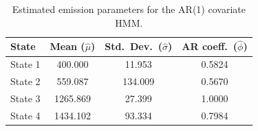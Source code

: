 \begin{table}[ht]
\centering
\begin{tabular}{lccc}
\hline
State & Mean ($\hat{\mu}$) & Std.\ Dev.\ ($\hat{\sigma}$) & AR coeff.\ ($\hat{\phi}$) \\
\hline
State 1 & 400.000 & 11.953 & 0.5824 \\
State 2 & 559.087 & 134.009 & 0.5670 \\
State 3 & 1265.869 & 27.399 & 1.0000 \\
State 4 & 1434.102 & 93.334 & 0.7984 \\
\hline
\end{tabular}
\caption{Estimated emission parameters for the AR(1) covariate HMM.}
\label{tab:ar_1_covariate_hmm_emissions}
\end{table}
